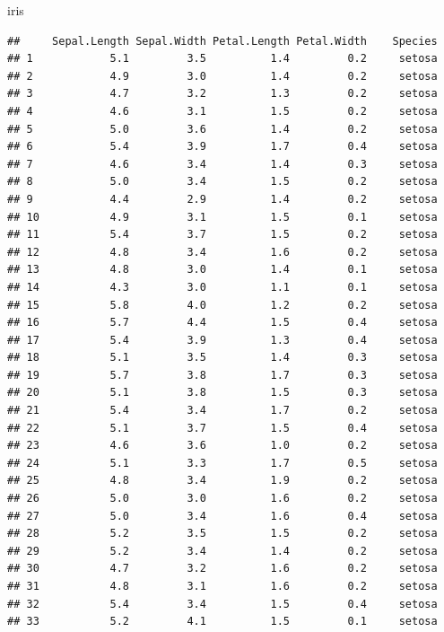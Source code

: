 \documentclass[
]{book}
\newenvironment{Shaded}{\begin{snugshade}}{\end{snugshade}}
\newcommand{\NormalTok}[1]{#1}
\begin{document}
\begin{Shaded}
\begin{Highlighting}[]
\NormalTok{iris}
\end{Highlighting}
\end{Shaded}

\begin{verbatim}
##     Sepal.Length Sepal.Width Petal.Length Petal.Width    Species
## 1            5.1         3.5          1.4         0.2     setosa
## 2            4.9         3.0          1.4         0.2     setosa
## 3            4.7         3.2          1.3         0.2     setosa
## 4            4.6         3.1          1.5         0.2     setosa
## 5            5.0         3.6          1.4         0.2     setosa
## 6            5.4         3.9          1.7         0.4     setosa
## 7            4.6         3.4          1.4         0.3     setosa
## 8            5.0         3.4          1.5         0.2     setosa
## 9            4.4         2.9          1.4         0.2     setosa
## 10           4.9         3.1          1.5         0.1     setosa
## 11           5.4         3.7          1.5         0.2     setosa
## 12           4.8         3.4          1.6         0.2     setosa
## 13           4.8         3.0          1.4         0.1     setosa
## 14           4.3         3.0          1.1         0.1     setosa
## 15           5.8         4.0          1.2         0.2     setosa
## 16           5.7         4.4          1.5         0.4     setosa
## 17           5.4         3.9          1.3         0.4     setosa
## 18           5.1         3.5          1.4         0.3     setosa
## 19           5.7         3.8          1.7         0.3     setosa
## 20           5.1         3.8          1.5         0.3     setosa
## 21           5.4         3.4          1.7         0.2     setosa
## 22           5.1         3.7          1.5         0.4     setosa
## 23           4.6         3.6          1.0         0.2     setosa
## 24           5.1         3.3          1.7         0.5     setosa
## 25           4.8         3.4          1.9         0.2     setosa
## 26           5.0         3.0          1.6         0.2     setosa
## 27           5.0         3.4          1.6         0.4     setosa
## 28           5.2         3.5          1.5         0.2     setosa
## 29           5.2         3.4          1.4         0.2     setosa
## 30           4.7         3.2          1.6         0.2     setosa
## 31           4.8         3.1          1.6         0.2     setosa
## 32           5.4         3.4          1.5         0.4     setosa
## 33           5.2         4.1          1.5         0.1     setosa

\end{verbatim}
\end{document}
